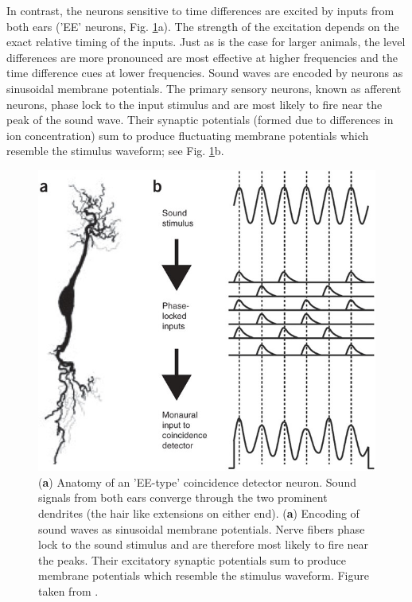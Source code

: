 In contrast, the neurons sensitive to time differences are excited by inputs from both ears ('EE' neurons, Fig. \ref{EEtypedetector}a). The strength of the
excitation depends on the exact relative timing of the inputs. Just as is the case for larger animals, the level
differences are more pronounced are most effective at higher frequencies and the time difference cues at lower frequencies. Sound waves are encoded
by neurons as sinusoidal membrane potentials. The primary sensory neurons, known as afferent neurons, phase lock to the input
stimulus and are most likely to fire near the peak of the sound wave. Their synaptic potentials (formed due to differences
in ion concentration) sum to produce fluctuating membrane potentials which resemble the stimulus waveform; see Fig. \ref{EEtypedetector}b. 
\begin{figure}[ht!]
 \centering
 \includegraphics[width=0.7\linewidth]{Diagrams/EEtypedetector.jpg}
 \caption[EE-type coincidence detector and encoding of sound waves as membrane potentials.]{(\textbf{a}) Anatomy of an 'EE-type'
 coincidence detector neuron. Sound signals from both ears converge through the two prominent dendrites (the hair like extensions
 on either end). (\textbf{a}) Encoding of sound waves as sinusoidal membrane potentials. Nerve fibers phase lock to the sound stimulus and
 are therefore most likely to fire near the peaks. Their excitatory synaptic potentials sum to produce membrane potentials which resemble the
 stimulus waveform. Figure taken from \cite{schnuppcarr}.}
 \label{EEtypedetector}
\end{figure}

